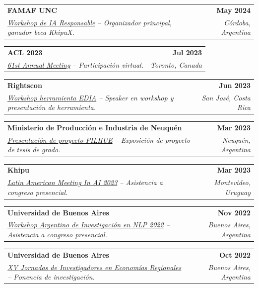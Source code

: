 \documentclass[letterpaper,11pt]{article}
\makeatletter
\newif\ifeng
\newcommand{\lang}[2]{\ifeng #1\else #2\fi}
\newcommand{\resumeSubheading}[4]{
  \vspace{-2pt}\item
    \begin{tabular*}{1.0\textwidth}[t]{l@{\extracolsep{\fill}}r}
      \textbf{\large#1} & \textbf{\small #2} \\
      \textit{\large#3} & \textit{\small #4} \\
    \end{tabular*}\vspace{-7pt}
}
\makeatother
\begin{document}
        \resumeSubheading{FAMAF UNC \href{https://famaf.unc.edu.ar/}{\raisebox{-0.1\height}\faExternalLink } }{May 2024}
        {\small \underline{\lang{Responsible AI Workshop}{Workshop de IA Responsable}} \lang{-- Main organizer, KhipuX/Americas Fund grantee.}{-- Organizador principal, ganador beca KhipuX.}}{Córdoba, Argentina}

        \resumeSubheading{ACL 2023 \href{https://2023.aclweb.org/}{\raisebox{-0.1\height}\faExternalLink } }{Jul 2023}
        {\small \underline{61st Annual Meeting} \lang{-- Virtual participation.}{-- Participación virtual.}}{Toronto, Canada}

        \resumeSubheading{Rightscon \href{https://www.vialibre.org.ar/en/workshop-at-rightscon/}{\raisebox{-0.1\height}\faExternalLink } }{Jun 2023}
        {\small \underline{\lang{EDIA Tool Workshop}{Workshop herramienta EDIA}} \lang{-- Workshop speaker and tool presentation.}{-- Speaker en workshop y presentación de herramienta.}}{San José, Costa Rica}
    
        \resumeSubheading{Ministerio de Producción e Industria de Neuquén \href{https://www.neuqueninforma.gob.ar/inteligencia-artificial-aplicada-a-la-huerta-agroecologica-y-al-compostaje/?fbclid=IwAR0BTbs4tyQs2FSaoP-7I5oXE2KOZoEcTGLar682mSmbxoktTRPn1YLyBa8}{\raisebox{-0.1\height}\faExternalLink } }{Mar 2023}
        {\small \underline{\lang{PILHUE Project Presentation}{Presentación de proyecto PILHUE}} \lang{-- Presentation of thesis research project.}{-- Exposición de proyecto de tesis de grado.}}{Neuquén, Argentina}
    
        \resumeSubheading{Khipu \href{https://khipu.ai/}{\raisebox{-0.1\height}\faExternalLink } }{Mar 2023}
        {\small \underline{Latin American Meeting In AI 2023} \lang{-- Conference attendance.}{-- Asistencia a congreso presencial.}}{Montevideo, Uruguay}
        
        \resumeSubheading{Universidad de Buenos Aires \href{https://sites.google.com/view/workshop-nlp}{\raisebox{-0.1\height}\faExternalLink } }{Nov 2022}
        {\small \underline{\lang{Argentine Workshop on NLP Research 2022}{Workshop Argentino de Investigación en NLP 2022}} \lang{-- Conference attendance.}{-- Asistencia a congreso presencial.}}{Buenos Aires, Argentina}

        \resumeSubheading{Universidad de Buenos Aires \href{https://drive.google.com/file/d/1AgZmRDGiWzFH0PLRxKPXXvFG8yO34Oky/view?usp=sharing}{\raisebox{-0.1\height}\faExternalLink } }{Oct 2022}
        {\small \underline{\lang{XV National Conf. of Researchers in Regional Economies}{XV Jornadas de Investigadores en Economías Regionales}} \lang{-- Presentation of research.}{-- Ponencia de investigación.}}{Buenos Aires, Argentina}
        
\end{document}

